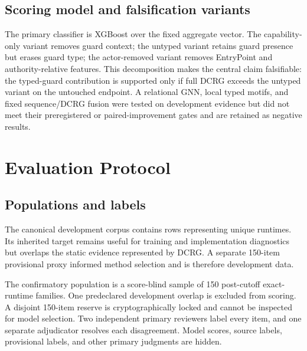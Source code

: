 \documentclass[conference]{IEEEtran}
\begin{document}
\subsection{Scoring model and falsification variants}

The primary classifier is XGBoost over the fixed aggregate vector. The capability-only variant
removes guard context; the untyped variant retains guard presence but erases guard type; the
actor-removed variant removes EntryPoint and authority-relative features. This decomposition makes
the central claim falsifiable: the typed-guard contribution is supported only if full DCRG exceeds
the untyped variant on the untouched endpoint. A relational GNN, local typed motifs, and fixed
sequence/DCRG fusion were tested on development evidence but did not meet their preregistered or
paired-improvement gates and are retained as negative results.

\section{Evaluation Protocol}

\subsection{Populations and labels}

The canonical development corpus contains \CanonicalRows{} rows representing
\CanonicalRuntimes{} unique runtimes. Its
inherited target remains useful for training and implementation diagnostics but overlaps the static
evidence represented by DCRG. A separate 150-item provisional proxy informed method selection and is
therefore development data.

The confirmatory population is a score-blind sample of 150 post-cutoff exact-runtime families. One
predeclared development overlap is excluded from scoring. A disjoint 150-item reserve is
cryptographically locked and cannot be inspected for model selection. Two independent primary
reviewers label every item, and one separate adjudicator resolves each disagreement. Model scores,
source labels, provisional labels, and other primary judgments are hidden.
\end{document}
